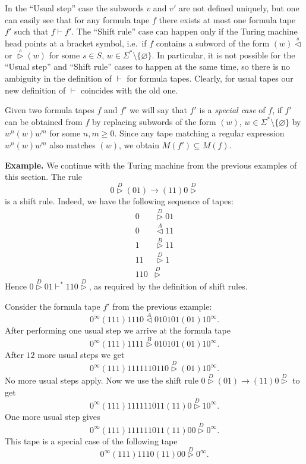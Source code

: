 \documentclass{article}
\newcommand{\lhead}[1]{\stackrel{#1}\triangleleft}
\newcommand{\rhead}[1]{\stackrel{#1}\triangleright}
\begin{document}
In the ``Usual step'' case the subwords \( v \) and \( v' \) are not defined uniquely, but one can easily see that for any formula tape \( f \)
there exists at most one formula tape \( f' \) such that \( f \vdash f' \).
The ``Shift rule'' case can happen only if the Turing machine head points at a bracket symbol, i.e.\ if \( f \) contains a subword
of the form \( (w) \lhead{s} \) or \( \rhead{s} (w) \) for some \( s \in S \), \( w \in \Sigma^* \setminus \{ \varnothing \} \). In particular,
it is not possible for the ``Usual step'' and ``Shift rule'' cases to happen at the same time, so there is no ambiguity in the definition of \( \vdash \) for formula tapes.
Clearly, for usual tapes our new definition of \( \vdash \) coincides with the old one.

Given two formula tapes \( f \) and \( f' \) we will say that \( f' \) is a \emph{special case} of \( f \), if \( f' \) can
be obtained from \( f \) by replacing subwords of the form \( (w) \), \( w \in \Sigma^* \setminus \{ \varnothing \} \) by
\( w^n (w) w^m \) for some \( n, m \geq 0 \). Since any tape matching a regular expression \( w^n (w) w^m \) also matches \( (w) \),
we obtain \( M(f') \subseteq M(f) \).
\medskip

\noindent\textbf{Example.} We continue with the Turing machine from the previous examples of this section.
The rule
\[ 0 \rhead{D} (01) \to (11) 0 \rhead{D} \]
is a shift rule. Indeed, we have the following sequence of tapes:
\begin{align*}
	0 &\rhead{D} 01\\
	0 &\lhead{A} 11\\
	1 &\rhead{B} 11\\
	11 &\rhead{D} 1\\
	110 &\rhead{D}
\end{align*}
Hence \( 0 \rhead{D} 01 \vdash^* 110 \rhead{D} \), as required by the definition of shift rules.

Consider the formula tape \( f' \) from the previous example:
\[ 0^\infty (111) 1110 \lhead{A} 010101(01) 1 0^\infty. \]
After performing one usual step we arrive at the formula tape
\[ 0^\infty (111) 1111 \rhead{B} 010101(01) 1 0^\infty. \]
After \( 12 \) more usual steps we get
\[ 0^\infty (111) 1111110110 \rhead{D} (01) 1 0^\infty. \]
No more usual steps apply. Now we use the shift rule \( 0 \rhead{D} (01) \to (11) 0 \rhead{D} \) to get
\[ 0^\infty (111) 111111011 (11) 0 \rhead{D} 1 0^\infty. \]
One more usual step gives
\[ 0^\infty (111) 111111011 (11) 00 \rhead{D} 0^\infty. \]
This tape is a special case of the following tape
\[ 0^\infty (111) 1110 (11) 00 \rhead{D} 0^\infty. \]
\medskip
\end{document}
